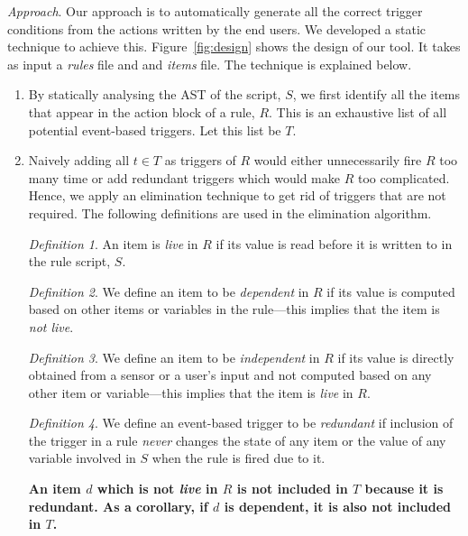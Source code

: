 \documentclass{sig-alternate-05-2015}
\begin{document}
\emph{Approach}. Our approach is to automatically generate all the correct trigger conditions from the actions written by the end users. We developed a static technique to achieve this. Figure~\ref{fig:design} shows the design of our tool. It takes as input a \textit{rules} file and and \textit{items} file. The technique is explained below.
\begin{enumerate}
\item By statically analysing the AST of the script, $S$, we first identify all the items that appear in the action block of a rule, $R$. This is an exhaustive list of all potential event-based triggers. Let this list be $T$.
\item Naively adding all $t \in T$ as triggers of $R$ would either unnecessarily fire $R$ too many time or add redundant triggers which would make $R$ too complicated. Hence, we apply an elimination technique to get rid of triggers that are not required. The following definitions are used in the elimination algorithm. 

\emph{Definition 1}. An item is \emph{live} in $R$ if its value is read before it is written to in the rule script, $S$. 

\emph{Definition 2}. We define an item to be \emph{dependent} in $R$ if its value is computed based on other items or variables in the rule---this implies that the item is \emph{not live}. 
 
\emph{Definition 3}. We define an item to be \emph{independent} in $R$ if  its value is directly obtained from a sensor or a user's input and not computed based on any other item or variable---this implies that the item is \emph{live} in $R$. 

\emph{Definition 4}. We define an event-based trigger to be \emph{redundant} if inclusion of the trigger in a rule \emph{never} changes the state of any item or the value of any variable involved in $S$ when the rule is fired due to it.

\textbf{An item $d$ which is not \textit{live} in $R$ is not included in $T$ because it is redundant. As a corollary, if $d$ is dependent, it is also not included in $T$.}


\end{enumerate}
\end{document}
